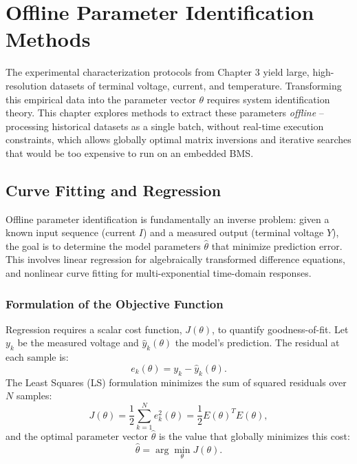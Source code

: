 
\chapter{Offline Parameter Identification Methods}
\label{chap:offline_identification}

The experimental characterization protocols from Chapter 3 yield large, high-resolution datasets of terminal voltage, current, and temperature. Transforming this empirical data into the parameter vector $\theta$ requires system identification theory. This chapter explores methods to extract these parameters \emph{offline} -- processing historical datasets as a single batch, without real-time execution constraints, which allows globally optimal matrix inversions and iterative searches that would be too expensive to run on an embedded BMS.

\section{Curve Fitting and Regression}
\label{sec:curve_fitting_regression}

Offline parameter identification is fundamentally an inverse problem: given a known input sequence (current $I$) and a measured output (terminal voltage $Y$), the goal is to determine the model parameters $\hat{\theta}$ that minimize prediction error. This involves linear regression for algebraically transformed difference equations, and nonlinear curve fitting for multi-exponential time-domain responses.

\subsection{Formulation of the Objective Function}
\label{subsec:objective_function}

Regression requires a scalar cost function, $J(\theta)$, to quantify goodness-of-fit. Let $y_k$ be the measured voltage and $\hat{y}_k(\theta)$ the model's prediction. The residual at each sample is:
\begin{equation}
\label{eq:residual_def}
e_k(\theta) = y_k - \hat{y}_k(\theta).
\end{equation}
The Least Squares (LS) formulation minimizes the sum of squared residuals over $N$ samples:
\begin{equation}
\label{eq:least_squares_cost}
J(\theta) = \frac{1}{2} \sum_{k=1}^{N} e_k^2(\theta) = \frac{1}{2} E(\theta)^T E(\theta),
\end{equation}
and the optimal parameter vector $\hat{\theta}$ is the value that globally minimizes this cost:
\begin{equation}
\label{eq:argmin_ls}
\hat{\theta} = \arg\min_{\theta} J(\theta).
\end{equation}

